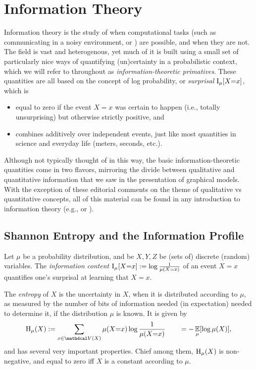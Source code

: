 \section{Information Theory}
    \label{sec:prelim-infotheory}

Information theory is the study of when computational tasks
    (such as communicating in a noisy environment, 
        or )
    are possible, and when they are not. 
%
The field is vast and heterogenous, 
    yet much of it is built using a small set of 
    particularly nice ways of quantifying (un)certainty in a probabilistic
    context, which we will refer to throughout as \emph{information-theoretic primatives}.
These quantities are all based on the concept of log probability, or \emph{surprisal} $\operatorname{\mathrm{I}}_{\mu}[ X{=}x]$, which is
\begin{itemize}[nosep]
\item equal to zero if the event $X{=}x$ was certain to happen (i.e., totally unsurprising) but otherwise strictly positive, and
\item combines additively over independent events, just like most quantities in science and everyday life (meters, seconds, etc.).
\end{itemize}


Although not typically thought of in this way, 
    the basic information-theoretic quantities come in two flavors, mirroring the divide between qualitative and quantitative information that we saw in the presentation of graphical models. 
With the exception of these editorial comments on the theme of qualitative vs quantitative concepts, all of this material can be found in any introduction to information
theory (e.g., \citet[Chapter 1]{mackay2003information} or \citet{CoverThomas}).  

\subsection{Shannon Entropy and the Information Profile}
    \label{sec:qual-info-theory-primer}

Let $\mu$ be a probability distribution, and be $X,Y,Z$
    be (sets of) discrete (random) variables.
The \emph{information content} $\operatorname{\mathrm{I}}_{\mu}[ X{=}x ] := \log \frac1{\mu(X{=}x)}$ of an event $X{=}x$ quantifies one's surprisal at learning that $X{=}x$.
    
The \emph{entropy} of $X$ is the uncertainty in $X$, when it is distributed according to $\mu$, as measured by the number of bits of information needed (in expectation) needed to determine it, if the distribution $\mu$ is known.  It is given by 
\[
    \H_\mu(X) := \sum_{x \in \V(X)} \mu(X{=}x) \log \frac{1}{\mu(X{=}x)} \qquad= -\Ex_{\mu}[\log \mu(X)],
\]
and has several very important properties. 
Chief among them, $\operatorname{\mathrm{H}}_\mu(X)$ is non-negative, and equal to zero iff $X$ 
    is a constant according to $\mu$. 

